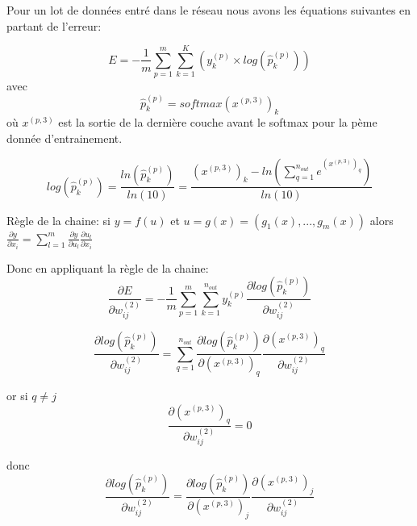 \documentclass[a4paper,11pt,oneside,roman]{article}
\begin{document}
    Pour un lot de données entré dans le réseau nous avons les équations suivantes en partant de l'erreur:
    
    \begin{equation}
        E = -\frac{1}{m} \sum\limits_{p=1}^m\sum\limits_{k=1}^K (y_{k}^{(p)} \times log(\hat{p}_{k}^{(p)}))
    \end{equation}
avec 
    \begin{equation}
        \hat{p}_{k}^{(p)} = softmax(x^{(p,3)})_k
    \end{equation}
    où $x^{(p,3)}$ est la sortie de la dernière couche avant le softmax pour la pème donnée d'entrainement.
 
    \begin{equation}
        log(\hat{p}_{k}^{(p)}) = \frac{ln(\hat{p}_{k}^{(p)})}{ln(10)} = \frac{(x^{(p,3)})_k - ln(\sum\limits_{q=1}^{n_{out}} e^{(x^{(p,3)})_q})} {ln(10)}
    \end{equation}

    Règle de la chaine:
    si $y = f(u)$ et $u=g(x)=(g_1(x), ..., g_m(x))$ alors $\frac{\partial y}{\partial x_i} = \sum\limits_{l=1}^{m} \frac{\partial y}{\partial u_l} \frac{\partial u_l}{\partial x_i}$
    
    Donc en appliquant la règle de la chaine:
    \begin{equation}
        \frac{\partial E}{\partial w_{ij}^{(2)}} = -\frac{1}{m} \sum\limits_{p=1}^{m} \sum\limits_{k=1}^{n_{out}} y_k^{(p)} \frac{\partial log(\hat{p}_{k}^{(p)})}{\partial w_{ij}^{(2)}}
    \end{equation}
    
    \begin{equation}
        \frac{\partial log(\hat{p}_{k}^{(p)})}{\partial w_{ij}^{(2)}} = \sum\limits_{q=1}^{n_{out}} \frac{\partial log(\hat{p}_{k}^{(p)})}{\partial (x^{(p,3)})_{q}} \frac{\partial (x^{(p,3)})_{q}}{\partial w_{ij}^{(2)}}
    \end{equation}
    
    or si $q \ne j$
    \begin{equation}
       \frac{\partial (x^{(p,3)})_{q}}{\partial w_{ij}^{(2)}} = 0
    \end{equation}
    
    donc
    \begin{equation}
        \frac{\partial log(\hat{p}_{k}^{(p)})}{\partial w_{ij}^{(2)}} = \frac{\partial log(\hat{p}_{k}^{(p)})}{\partial (x^{(p,3)})_{j}} \frac{\partial (x^{(p,3)})_{j}}{\partial w_{ij}^{(2)}}
    \end{equation}
\end{document}
